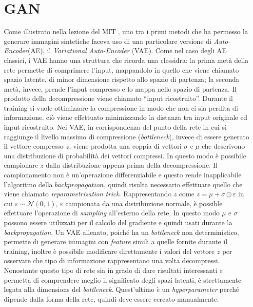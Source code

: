 


\section{GAN}
Come illustrato nella lezione del MIT \cite{MIT_GEN}, uno tra i primi metodi che ha permesso la generare immagini sintetiche faceva uso di una particolare versione di \emph{Auto-Encoder}(AE), il \emph{Variational Auto-Encoder} (VAE).
Come nel caso degli AE classici, i VAE hanno una struttura che ricorda una clessidra: la prima metà della rete permette di comprimere l'input, mappandolo in quello che viene chiamato spazio latente, di minor dimensione rispetto allo spazio di partenza;  la seconda metà, invece, prende l'input compresso e lo mappa nello spazio di partenza.
Il prodotto della decompressione viene chiamato ``input ricostruito''.
Durante il training si vuole ottimizzare la compressione in modo che non ci sia perdita di informazione, ciò viene effettuato minimizzando la distanza tra input originale ed input ricostruito.
Nei VAE, in corrispondenza del punto della rete in cui si raggiunge il livello massimo di compressione (\emph{bottleneck}), invece di essere generato il vettore compresso $z$, viene prodotta una coppia di vettori $\sigma$ e $\mu$ che descrivono una distribuzione di probabilità dei vettori compressi.
In questo modo è possibile campionare $z$ dalla distribuzione appena prima della decompressione.
Il campionamento non è un'operazione differenziabile e questo rende inapplicabile l'algoritmo della $backpropagation$, quindi risulta necessario effettuare quello che viene chiamato \emph{reparametrization trick}.
Rappresentando $z$ come $z = \mu + \sigma \odot \varepsilon$ in cui $\varepsilon \sim \mathcal{N}(0,1)$, $\varepsilon$ campionata da una distribuzione normale, è possible effettuare l'operazione di \emph{sampling} all'esterno della rete.
In questo modo $\mu$ e $\sigma$ possono essere utilizzati per il calcolo del gradiente e quindi usati durante la \emph{backpropagation}.
Un VAE allenato, poiché ha un \emph{bottleneck} non deterministico, permette di generare immagini con \emph{feature} simili a quelle fornite durante il training, inoltre è possibile modificare direttamente i valori del vettore $z$ per osservare che tipo di informazione rappresentano una volta decompressi.
Nonostante questo tipo di rete sia in grado di dare risultati interessanti e permetta di comprendere meglio il significato degli spazi latenti, è strettamente legata alla dimensions del \emph{bottleneck}.
Quest'ultimo è un \emph{hyperparameter} perché dipende dalla forma della rete, quindi deve essere cercato manualmente.

